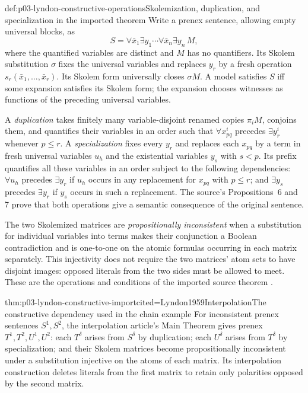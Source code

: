 \begin{hbdefinition}{def:p03-lyndon-constructive-operations}{Skolemization, duplication, and specialization in the imported theorem}
Write a prenex sentence, allowing empty universal blocks, as
\[
 S=\forall\bar x_1\exists y_1\cdots
       \forall\bar x_n\exists y_n\,M,
\]
where the quantified variables are distinct and \(M\) has no quantifiers.
Its Skolem substitution \(\sigma\) fixes the universal variables and
replaces \(y_r\) by a fresh operation
\(s_r(\bar x_1,\ldots,\bar x_r)\). Its Skolem form universally closes
\(\sigma M\). A model satisfies \(S\) iff some expansion satisfies
its Skolem form; the expansion chooses witnesses as functions of the
preceding universal variables.

A \emph{duplication} takes finitely many variable-disjoint renamed copies
\(\pi_iM\), conjoins them, and quantifies their variables in an order
such that \(\forall x_{pq}^{i}\) precedes \(\exists y_r^{i}\) whenever
\(p\leq r\). A \emph{specialization} fixes every \(y_r\) and replaces
each \(x_{pq}\) by a term in fresh universal variables \(u_h\) and
the existential variables \(y_s\) with \(s<p\). Its prefix quantifies
all these variables in an order subject to the following dependencies:
\(\forall u_h\) precedes \(\exists y_r\) if \(u_h\) occurs in any
replacement for \(x_{pq}\) with \(p\leq r\); and \(\exists y_s\)
precedes \(\exists y_r\) if \(y_s\) occurs in such a replacement.
The source's Propositions~6 and 7 prove that both operations give a
semantic consequence of the original sentence.

The two Skolemized matrices are \emph{propositionally inconsistent}
when a substitution for individual variables into terms makes their
conjunction a Boolean contradiction and is one-to-one on the atomic
formulas occurring in each matrix separately. This injectivity does not
require the two matrices' atom sets to have disjoint images: opposed
literals from the two sides must be allowed to meet. These are the
operations and conditions of the imported source theorem
\cite[pp.~134--137]{Lyndon1959Interpolation}.
\end{hbdefinition}

\begin{hbtheorem}{thm:p03-lyndon-constructive-import}{cited=Lyndon1959Interpolation}{The constructive dependency used in the chain example}
For inconsistent prenex sentences \(S^1,S^2\), the interpolation article's
Main Theorem gives prenex \(T^1,T^2,U^1,U^2\): each \(T^\delta\)
arises from \(S^\delta\) by duplication; each \(U^\delta\) arises
from \(T^\delta\) by specialization; and their Skolem matrices become
propositionally inconsistent under a substitution injective on the atoms
of each matrix. Its interpolation construction deletes literals from the
first matrix to retain only polarities opposed by the second matrix.
\end{hbtheorem}

